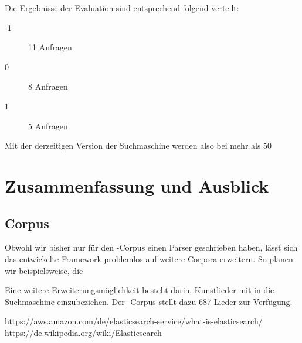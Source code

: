 Die Ergebnisse der Evaluation sind entsprechend folgend verteilt:
\begin{description}
    \item[-1] 11 Anfragen
    \item[0] 8 Anfragen
    \item[1] 5 Anfragen
\end{description}

Mit der derzeitigen Version der Suchmaschine werden also bei mehr als 50%

\section{Zusammenfassung und Ausblick}

\subsection{Corpus}
Obwohl wir bisher nur für den -Corpus
einen Parser geschrieben haben,
lässt sich das entwickelte Framework problemlos auf weitere Corpora erweitern.
So planen wir beispielsweise, die


Eine weitere Erweiterungsmöglichkeit besteht darin, Kunstlieder mit in die Suchmaschine einzubeziehen.
Der -Corpus stellt dazu 687 Lieder zur Verfügung.

https://aws.amazon.com/de/elasticsearch-service/what-is-elasticsearch/
https://de.wikipedia.org/wiki/Elasticsearch
